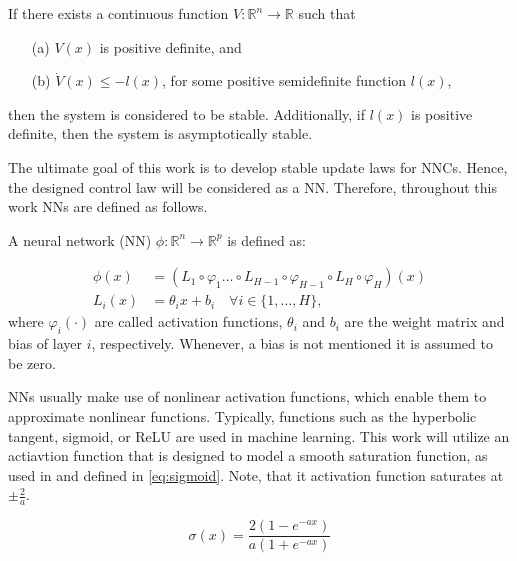\begin{definition}
    If there exists a continuous function $V: \mathbb{R}^n \rightarrow \mathbb{R}$ such that
     \begin{enumerate}
       \item[(a)] $V(x)$ is positive definite, and
       \item[(b)] $\dot{V}(x)\leq-l(x)$, for some positive semidefinite function $l(x)$,
     \end{enumerate}
    then the system is considered to be stable. Additionally, if $l(x)$ is positive definite, then the system is asymptotically stable.
     \label{def:lyapunov-stability}
\end{definition}

The ultimate goal of this work is to develop stable update laws for NNCs. Hence, the designed control law will be considered as a NN. Therefore, throughout this work NNs are defined as follows.

\begin{definition}
    A neural network (NN) $\phi:\mathbb{R}^n\rightarrow \mathbb{R}^p$ is defined as:
   
     \begin{equation}
      \begin{aligned}
        \phi (x) & = (L_1 \circ \varphi_1 \dots \circ L_{H-1} \circ \varphi_{H-1} \circ L_{H} \circ \varphi_H)(x)\\
        L_i(x) &= \theta_i x + b_i \quad \forall i\in\{1,..., H\},
      \end{aligned}
    \end{equation}
     where $\varphi_i(\cdot)$ are called  activation functions, $\theta_i$ and $b_i$ are the weight matrix and bias of layer $i$, respectively. Whenever, a bias is not mentioned it is assumed to be zero.
\end{definition}

NNs usually make use of nonlinear activation functions, which enable them to approximate nonlinear functions. Typically, functions such as the hyperbolic tangent, sigmoid, or ReLU are used in machine learning. This work will utilize an actiavtion function that is designed to model a smooth saturation function, as used in \cite{wahby, thanhNonlinearPIDControl2006} and defined in \eqref{eq:sigmoid}. Note, that it activation function saturates at $\pm \frac{2}{a}$.

\begin{equation}
    \sigma (x) = \frac{2(1-e^{-ax})}{a(1+e^{-ax})}
    \label{eq:sigmoid}
\end{equation}


